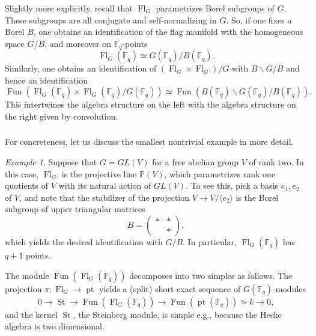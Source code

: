 \documentclass[10pt]{amsart}
\newcommand{\sB}{\on{Fl}_G}
\newcommand{\on}{\operatorname}
\newcommand{\Fq}{\mathbb{F}_q}
\newcommand{\Fun}{\on{Fun}}
\theoremstyle{remark}
\newtheorem{ex}[subsubsection]{Example}
\numberwithin{equation}{section}
\begin{document}
	\subsubsection{} Slightly more explicitly, recall that $\sB$ parametrizes 
	Borel subgroups of $G$. These subgroups are all conjugate and self-normalizing in 
	$G$. So, if one fixes a Borel $B$, one obtains an identification of the 
	flag manifold with the homogeneous space $G/B$, and moreover on $\Fq$-points
	\[
	\sB(\mathbb{F}_q) \simeq G(\Fq)/B(\Fq).
	\]
	Similarly, one obtains an identification of $(\sB \times \sB) /G$ with $B 
	\backslash G / B$ and hence an identification 
	\[
	\Fun( \sB(\mathbb{F}_q) \times \sB(\mathbb{F}_q) / G(\mathbb{F}_q)) \simeq 
	\Fun( B(\Fq) \backslash G(\Fq) / B(\Fq)). 
	\]
	This intertwines the algebra structure on the left with the algebra structure on the right given by convolution. 
	
	
	
	
	
	
	
	
	
	
	
	
	
	
	
	
	
	\subsubsection{} For concreteness, let us discuss the smallest nontrivial 
	example in more detail. 
	
	\begin{ex} Suppose that $G = GL(V)$ for a free abelian group $V$ of rank 
	two. In this case, $\sB$ is the projective line $\mathbb{P}(V)$, which 
	parametrizes rank one quotients of $V$ with its natural action of $GL(V)$. 
	To see this, pick a basis $e_1, e_2$ of $V$, and note that the stabilizer 
	of the projection $V \rightarrow V / \langle e_2 \rangle$ is the Borel 
	subgroup of upper triangular matrices
		\[
		B =\begin{pmatrix} * & * \\ & * \end{pmatrix},
		\]
		which yields the desired identification with $G/B$. In particular, 
		$\sB(\mathbb{F}_q)$ has $q+1$ points.
		
		The module $\Fun(\sB(\mathbb{F}_q))$ decomposes into two simples as 
		follows. The projection $\pi: \sB \rightarrow \on{pt}$ yields a (split) 
		short exact sequence of $G(\mathbb{F}_q)$-modules
		\[
		0 \rightarrow \on{St} \rightarrow \Fun(\sB(\mathbb{F}_q)) \rightarrow 
		\Fun(\on{pt}(\mathbb{F}_q)) \simeq k \rightarrow 0,
		\]
		and the kernel $\on{St}$, the Steinberg module, is simple e.g., because the Hecke algebra is two dimensional. 
	\end{ex}
	
\end{document}
